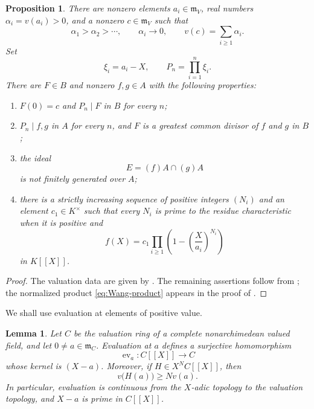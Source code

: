\documentclass[12pt]{amsart}
\newtheorem{proposition}[theorem]{Proposition}
\newtheorem{lemma}[theorem]{Lemma}
\theoremstyle{plain}
\begin{document}
\begin{proposition}\cite[Section 4 and 5]{Wang}\label{prop:Wang-data}
There are nonzero elements $a_i\in\mathfrak m_V$, real numbers
$\alpha_i=v(a_i)>0$, and a nonzero $c\in\mathfrak m_V$ such that
\[
  \alpha_1>\alpha_2>\cdots,
  \qquad
  \alpha_i\longrightarrow0,
  \qquad
  v(c)=\sum_{i\geq1}\alpha_i.
\]
Set
\[
  \xi_i=a_i-X,
  \qquad
  P_n=\prod_{i=1}^n\xi_i.
\]
There are $F\in B$ and nonzero $f,g\in A$ with the following
properties:
\begin{enumerate}[label=\textup{(\roman*)}]
  \item $F(0)=c$ and $P_n\mid F$ in $B$ for every $n$;
  \item $P_n\mid f,g$ in $A$ for every $n$, and $F$ is a greatest
  common divisor of $f$ and $g$ in $B$;
  \item the ideal
  \[
    E=(f)A\cap(g)A
  \]
  is not finitely generated over $A$;
  \item there is a strictly increasing sequence of positive integers
  $(N_i)$ and an element $c_1\in K^\times$ such that every $N_i$ is
  prime to the residue characteristic when it is positive and
  \begin{equation}\label{eq:Wang-product}
    f(X)=c_1\prod_{i\geq1}
    \left(1-\left(\frac{X}{a_i}\right)^{N_i}\right)
  \end{equation}
  in $K[[X]]$.
\end{enumerate}
\end{proposition}

\begin{proof}
The valuation data are given by
\cite[Construction Lemma~4.2]{Wang}.  The remaining assertions follow
from \cite[Propositions~5.1--5.3 and the proof of
Theorem~4.1(i)]{Wang}; the normalized product
\eqref{eq:Wang-product} appears in the proof of
\cite[Proposition~5.2]{Wang}.
\end{proof}

We shall use evaluation at elements of positive value.

\begin{lemma}\label{lem:evaluation}
Let $C$ be the valuation ring of a complete nonarchimedean valued
field, and let $0\neq a\in\mathfrak m_C$.  Evaluation at $a$ defines a
surjective homomorphism
\[
  \operatorname{ev}_a:C[[X]]\longrightarrow C
\]
whose kernel is $(X-a)$.  Moreover, if $H\in X^NC[[X]]$, then
\begin{equation}\label{eq:evaluation-continuity}
  v\bigl(H(a)\bigr)\geq Nv(a).
\end{equation}
In particular, evaluation is continuous from the $X$-adic topology to
the valuation topology, and $X-a$ is prime in $C[[X]]$.
\end{lemma}
\end{document}
